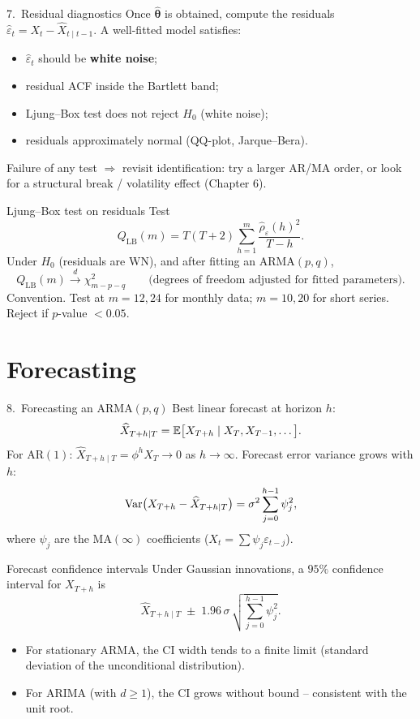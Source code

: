 \documentclass[aspectratio=169]{beamer}
\begin{document}
\begin{frame}{7.~Residual diagnostics}
  Once $\widehat{\bm\theta}$ is obtained, compute the residuals
  $\widehat\varepsilon_t = X_t - \widehat X_{t \mid t-1}$.
  A well-fitted model satisfies:
  \begin{itemize}
    \item $\widehat\varepsilon_t$ should be \textbf{white noise};
    \item residual ACF inside the Bartlett band;
    \item Ljung--Box test does not reject $H_0$ (white noise);
    \item residuals approximately normal (QQ-plot, Jarque--Bera).
  \end{itemize}
  \pause
  Failure of any test $\Rightarrow$ revisit identification: try a
  larger AR/MA order, or look for a structural break / volatility
  effect (Chapter 6).
\end{frame}

\begin{frame}{Ljung--Box test on residuals}
  Test
  \[
    Q_{\text{LB}}(m)
    = T(T+2) \sum_{h=1}^{m}
      \frac{\widehat\rho_{\widehat\varepsilon}(h)^2}{T - h}.
  \]
  Under $H_0$ (residuals are WN), and after fitting an ARMA$(p,q)$,
  \[
    Q_{\text{LB}}(m) \xrightarrow{d} \chi^2_{m - p - q}
    \qquad\text{(degrees of freedom adjusted for fitted parameters)}.
  \]
  \pause
  \alert{Convention.} Test at $m = 12, 24$ for monthly data; $m =
  10, 20$ for short series. Reject if $p$-value $< 0.05$.
\end{frame}

\section{Forecasting}

\begin{frame}{8.~Forecasting an ARMA$(p,q)$}
  Best linear forecast at horizon $h$:
  \[
    \widehat X_{T+h \mid T}
    = \mathbb{E}\bigl[X_{T+h} \mid X_T, X_{T-1}, \dots\bigr].
  \]
  For AR$(1)$:
  $\widehat X_{T+h \mid T} = \phi^h X_T \to 0$ as $h \to \infty$.
  \pause
  Forecast error variance grows with $h$:
  \[
    \mathrm{Var}\bigl(X_{T+h} - \widehat X_{T+h \mid T}\bigr)
    = \sigma^2 \sum_{j=0}^{h-1} \psi_j^2,
  \]
  where $\psi_j$ are the MA$(\infty)$ coefficients
  ($X_t = \sum \psi_j \varepsilon_{t-j}$).
\end{frame}

\begin{frame}{Forecast confidence intervals}
  Under Gaussian innovations, a $95\%$ confidence interval for
  $X_{T+h}$ is
  \[
    \widehat X_{T+h \mid T}
    \;\pm\; 1.96\, \sigma\,
        \sqrt{\sum_{j=0}^{h-1} \psi_j^2}.
  \]
  \pause
  \begin{itemize}
    \item For stationary ARMA, the CI width tends to a finite limit
          (standard deviation of the unconditional distribution).
    \item For ARIMA (with $d \geq 1$), the CI grows without bound --
          consistent with the unit root.
  \end{itemize}
\end{frame}
\end{document}
